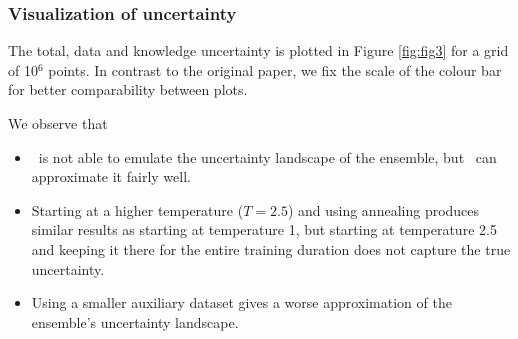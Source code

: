 \subsubsection{Visualization of uncertainty}
The total, data and knowledge uncertainty is plotted in Figure \ref{fig:fig3} for a grid of 10$^6$ points. In contrast to the original paper, we fix the scale of the colour bar for better comparability between plots.

We observe that
\begin{itemize}
    \item \EnDD \ is not able to emulate the uncertainty landscape of the ensemble, but \EnDDaux \ can approximate it fairly well.
    \item Starting at a higher temperature ($T = 2.5$) and using annealing produces similar results as starting at temperature 1, but starting at temperature 2.5 and keeping it there for the entire training duration does not capture the true uncertainty. 
    \item Using a smaller auxiliary dataset gives a worse approximation of the ensemble's uncertainty landscape. 
\end{itemize}


